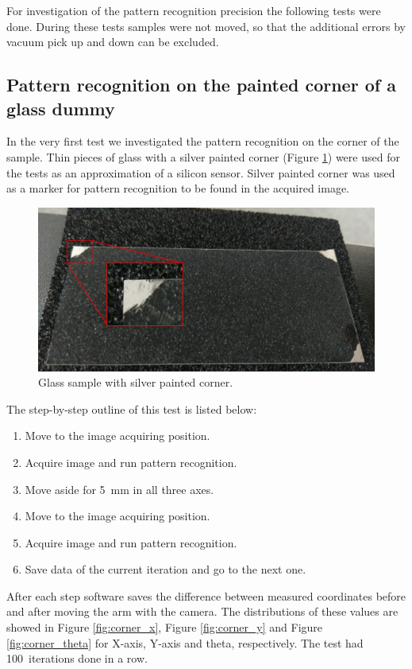 For investigation of the pattern recognition precision the following tests were done. During these tests samples were not moved, so that the additional errors by vacuum pick up and down can be excluded.

\subsection{Pattern recognition on the painted corner of a glass dummy}
In the very first test we investigated the pattern recognition on the corner of the sample. Thin pieces of glass with a silver painted corner (Figure \ref{fig:painted_corner}) were used for the tests as an approximation of a silicon sensor. Silver painted corner was used as a marker for pattern recognition to be found in the acquired image.  

\begin{figure}[ht]\centering
\includegraphics[width=0.8\linewidth]{Data/Precision_tests/Painted_corner.png}
\caption{Glass sample with silver painted corner.}
\label{fig:painted_corner}
\end{figure}

The step-by-step outline of this test is listed below:
\begin{enumerate}
\setlength\itemsep{-0.5em}
\item Move to the image acquiring position.
\item Acquire image and run pattern recognition.
\item Move aside for 5~mm in all three axes.
\item Move to the image acquiring position.
\item Acquire image and run pattern recognition.
\item Save data of the current iteration and go to the next one.
\end{enumerate}

After each step software saves the difference between measured coordinates before and after moving the arm with the camera. The distributions of these values are showed in Figure \ref{fig:corner_x}, Figure \ref{fig:corner_y} and Figure \ref{fig:corner_theta} for X-axis, Y-axis and theta, respectively. The test had 100~iterations done in a row.

